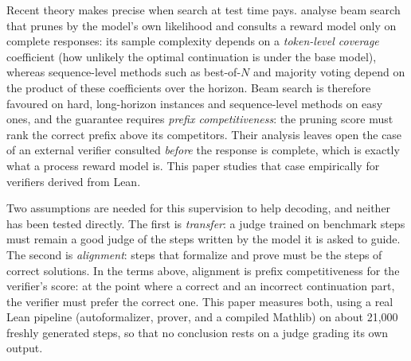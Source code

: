 \documentclass[10pt]{article}
\begin{document}
Recent theory makes precise when search at test time pays. \citet{he2026provable} analyse beam search that prunes by the model's own likelihood and consults a reward model only on complete responses: its sample complexity depends on a \emph{token-level coverage} coefficient (how unlikely the optimal continuation is under the base model), whereas sequence-level methods such as best-of-$N$ and majority voting depend on the product of these coefficients over the horizon. Beam search is therefore favoured on hard, long-horizon instances and sequence-level methods on easy ones, and the guarantee requires \emph{prefix competitiveness}: the pruning score must rank the correct prefix above its competitors. Their analysis leaves open the case of an external verifier consulted \emph{before} the response is complete, which is exactly what a process reward model is. This paper studies that case empirically for verifiers derived from Lean.

Two assumptions are needed for this supervision to help decoding, and neither has been tested directly. The first is \emph{transfer}: a judge trained on benchmark steps must remain a good judge of the steps written by the model it is asked to guide. The second is \emph{alignment}: steps that formalize and prove must be the steps of correct solutions. In the terms above, alignment is prefix competitiveness for the verifier's score: at the point where a correct and an incorrect continuation part, the verifier must prefer the correct one. This paper measures both, using a real Lean pipeline (autoformalizer, prover, and a compiled Mathlib) on about 21{,}000 freshly generated steps, so that no conclusion rests on a judge grading its own output.
\end{document}
